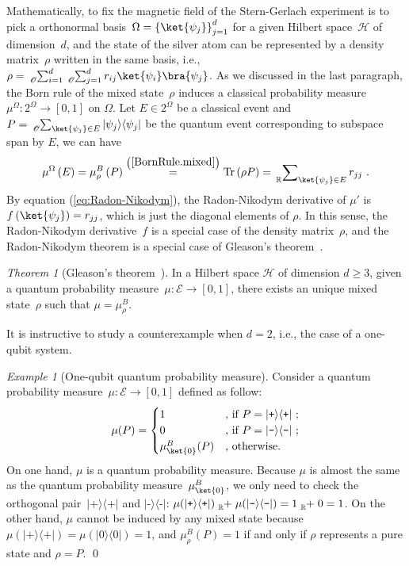 \documentclass{article}
\theoremstyle{remark}
\newtheorem{example}{Example}
\newtheorem{thm}{Theorem}
\newcommand{\events}{\ensuremath{\mathcal{E}}}
\newcommand{\pmeas}{\ensuremath{\mu}}
\newcommand{\Hilb}{\mathcal{H}}
\newcommand{\proj}[1]{|#1 \rangle\langle #1 |}
\newcommand{\ps}{\texttt{+}}
\newcommand{\ms}{\texttt{-}}
\newcommand{\Tr}{\mathop{\mathrm{Tr}}\nolimits}
\begin{document}
Mathematically, to fix the magnetic field of the Stern-Gerlach experiment
is to pick a orthonormal basis~$\Omega=\left\{ \ket{\psi_{j}}\right\} _{j=1}^{d}$
for a given Hilbert space~$\Hilb$ of dimension~$d$, and the state
of the silver atom can be represented by a density matrix~$\rho$
written in the same basis, i.e., $\rho=\tensor*[_{\mathscr{O}}]{\sum}{_{i=1}^{d}}\tensor*[_{\mathscr{O}}]{\sum}{_{j=1}^{d}}r_{ij}\ket{\psi_{i}}\bra{\psi_{j}}$.
As we discussed in the last paragraph, the Born rule of the mixed
state~$\rho$ induces a classical probability measure~$\pmeas^{\Omega}:2^{\Omega}\rightarrow[0,1]$
on $\Omega$. Let $E\in2^{\Omega}$ be a classical event and $P=\tensor*[_{\mathscr{O}}]{\sum}{_{\ket{\psi_{j}}\in E}}\proj{\psi_{j}}$
be the quantum event corresponding to subspace span by $E$, we can
have
\begin{equation}
\pmeas^{\Omega}\left(E\right)=\mu_{\rho}^{B}\left(P\right)\overset{\left(\ref{BornRule.mixed}\right)}{=}\Tr\left(\rho P\right)=\sideset{_{\mathbb{R}}}{_{\ket{\psi_{j}}\in E}}\sum r_{jj}\textrm{ .}\label{BornRule.mixed-1}
\end{equation}
By equation (\ref{eq:Radon-Nikodym}), the Radon-Nikodym derivative
of $\pmeas'$ is $f\left(\ket{\psi_{j}}\right)=r_{jj}$, which is
just the diagonal elements of $\rho$. In this sense, the Radon-Nikodym
derivative~$f$ is a special case of the density matrix~$\rho$,
and the Radon-Nikodym theorem is a special case of Gleason's theorem~\cite{HollandJr1970,Redhead1987-REDINA,Jaeger2007}.

\begin{thm}[Gleason's theorem~\cite{gleason1957,Redhead1987-REDINA,peres1995quantum}]\label{cor:Gleason's}In
a Hilbert space $\Hilb$ of dimension $d\geq3$, given a quantum probability
measure~$\mu:\events\rightarrow[0,1]$, there exists an unique mixed
state~$\rho$ such that $\mu=\mu_{\rho}^{B}$.\end{thm}

It is instructive to study a counterexample when $d=2$, i.e., the
case of a one-qubit system.

\begin{example}[One-qubit quantum probability measure] Consider
a quantum probability measure~$\mu:\events\rightarrow[0,1]$ defined
as follow: 
\[
\mu(P)=\begin{cases}
1 & \textrm{, if }P=\proj{\ps}\textrm{ ;}\\
0 & \textrm{, if }P=\proj{\ms}\textrm{ ;}\\
\mu_{\ket{0}}^{B}(P) & \textrm{, otherwise.}
\end{cases}
\]
On one hand, $\mu$ is a quantum probability measure. Because $\mu$
is almost the same as the quantum probability measure~$\mu_{\ket{0}}^{B}$,
we only need to check the orthogonal pair~$\proj{\ps}$ and $\proj{\ms}$:
$\mu(\proj{\ps})\tensor*[_{\mathbb{R}}]{+}{}\mu(\proj{\ms})=1\tensor*[_{\mathbb{R}}]{+}{}0=1$.
On the other hand, $\mu$ cannot be induced by any mixed state because
$\mu(\proj{\ps})=\mu(\proj{0})=1$, and $\mu_{\rho}^{B}(P)=1$ if
and only if $\rho$ represents a pure state and $\rho=P$. \qed\end{example}
\end{document}
